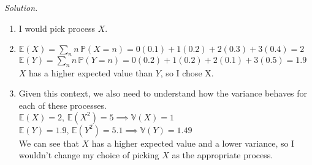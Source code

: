 \documentclass[11pt]{article}
\newenvironment{solution}{%
  \noindent\textit{Solution.}\quad
}{\par\bigskip}
\begin{document}
\begin{solution}
\begin{enumerate}
      \item I would pick process $X$.
      \item $\mathbb{E}(X) = \sum_n n\, \mathbb{P}(X=n) = 
            0(0.1) + 1(0.2) + 2(0.3) + 3(0.4) = 2$ \\
            $\mathbb{E}(Y) = \sum_n n\, \mathbb{P}(Y=n) = 
            0(0.2) + 1(0.2) + 2(0.1) + 3(0.5) = 1.9$ \\
            $X$ has a higher expected value than $Y$, so I chose X.
      \item Given this context, we also need to understand how the variance behaves 
            for each of these processes. \\
            $\mathbb{E}(X) = 2, \, \mathbb{E}(X^2)=5 \implies \mathbb{V}(X)=1$ \\
            $\mathbb{E}(Y) = 1.9, \, \mathbb{E}(Y^2)=5.1 \implies \mathbb{V}(Y)=1.49$ \\
            We can see that $X$ has a higher expected value and a lower variance, so 
            I wouldn't change my choice of picking $X$ as the appropriate process.
\end{enumerate}
\end{solution}
\end{document}
